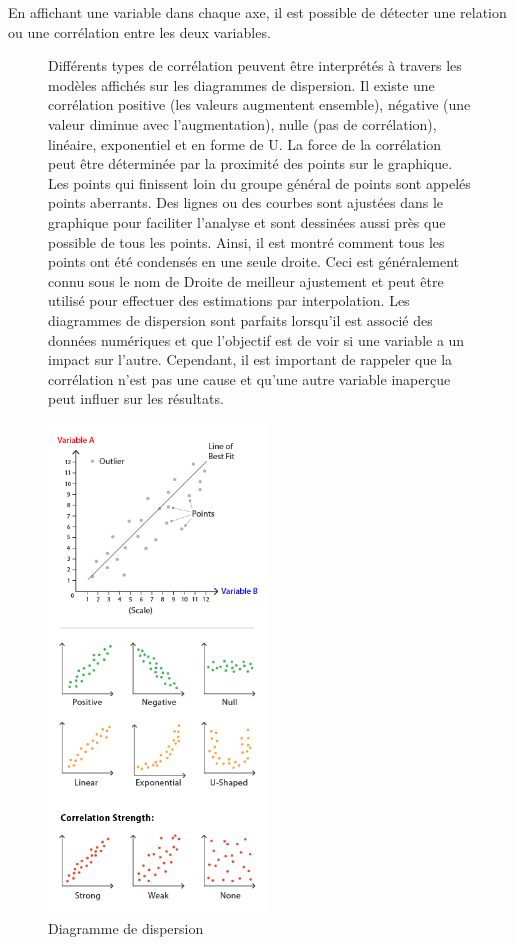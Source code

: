 \documentclass[french, a4paper, 12pt]{report}
\begin{document}
En affichant une variable dans chaque axe, il est possible de détecter une relation ou une corrélation entre les deux variables.
\begin{figure}[!htb]
\begin{minipage}{0.46\linewidth}
Différents types de corrélation peuvent être interprétés à travers les modèles affichés sur les diagrammes de dispersion. Il existe une corrélation positive (les valeurs augmentent ensemble), négative (une valeur diminue avec l’augmentation), nulle (pas de corrélation), linéaire, exponentiel et en forme de U. La force de la corrélation peut être déterminée par la proximité des points sur le graphique. Les points qui finissent loin du groupe général de points sont appelés points aberrants.
Des lignes ou des courbes sont ajustées dans le graphique pour faciliter l'analyse et sont dessinées aussi près que possible de tous les points. Ainsi, il est montré comment tous les points ont été condensés en une seule droite. Ceci est généralement connu sous le nom de Droite de meilleur ajustement et peut être utilisé pour effectuer des estimations par interpolation.
Les diagrammes de dispersion sont parfaits lorsqu’il est associé des données numériques et que l’objectif est de voir si une variable a un impact sur l'autre. Cependant, il est important de rappeler que la corrélation n'est pas une cause et qu'une autre variable inaperçue peut influer sur les résultats.
\end{minipage}\hfil
\begin{minipage}{0.35\linewidth}
    \includegraphics[height=13cm]{images/scatter-plot.png}
    \caption{\small Diagramme de dispersion \footnotemark}
 \label{fig:2.2}
\end{minipage}
\end{figure}
\end{document}
